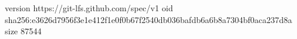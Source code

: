 version https://git-lfs.github.com/spec/v1
oid sha256:e3626d7956f3e1e412f1e0f0b67f2540db036bafdb6a6b8a7304bf0aca237d8a
size 87544
